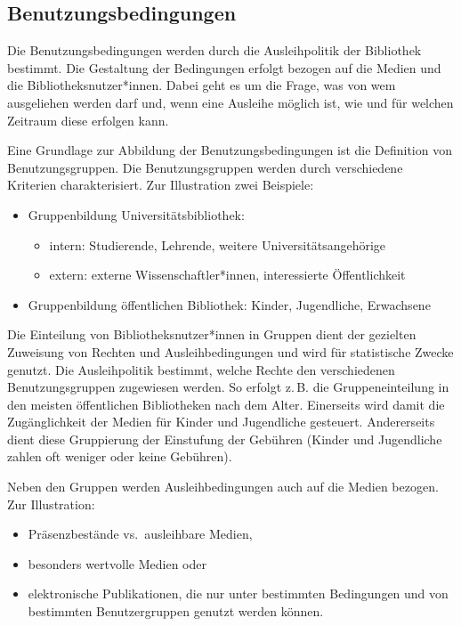 \documentclass[
  11pt,
  letterpaper,
  DIV=11,
  twoside]{scrreprt}
\begin{document}
\subsection{Benutzungsbedingungen}\label{benutzungsbedingungen}

Die Benutzungsbedingungen werden durch die Ausleihpolitik der Bibliothek
bestimmt. Die Gestaltung der Bedingungen erfolgt bezogen auf die Medien
und die Bibliotheksnutzer*innen. Dabei geht es um die Frage, was von wem
ausgeliehen werden darf und, wenn eine Ausleihe möglich ist, wie und für
welchen Zeitraum diese erfolgen kann.

Eine Grundlage zur Abbildung der Benutzungsbedingungen ist die
Definition von Benutzungsgruppen. Die Benutzungsgruppen werden durch
verschiedene Kriterien charakterisiert. Zur Illustration zwei Beispiele:

\begin{itemize}
\item
  Gruppenbildung Universitätsbibliothek:

  \begin{itemize}
  \item
    intern: Studierende, Lehrende, weitere Universitätsangehörige
  \item
    extern: externe Wissenschaftler*innen, interessierte Öffentlichkeit
  \end{itemize}
\item
  Gruppenbildung öffentlichen Bibliothek: Kinder, Jugendliche,
  Erwachsene
\end{itemize}

Die Einteilung von Bibliotheksnutzer*innen in Gruppen dient der
gezielten Zuweisung von Rechten und Ausleihbedingungen und wird für
statistische Zwecke genutzt. Die Ausleihpolitik bestimmt, welche Rechte
den verschiedenen Benutzungsgruppen zugewiesen werden. So erfolgt z.\,B.
die Gruppeneinteilung in den meisten öffentlichen Bibliotheken nach dem
Alter. Einerseits wird damit die Zugänglichkeit der Medien für Kinder
und Jugendliche gesteuert. Andererseits dient diese Gruppierung der
Einstufung der Gebühren (Kinder und Jugendliche zahlen oft weniger oder
keine Gebühren).

Neben den Gruppen werden Ausleihbedingungen auch auf die Medien bezogen.
Zur Illustration:

\begin{itemize}
\item
  Präsenzbestände vs.~ausleihbare Medien,
\item
  besonders wertvolle Medien oder
\item
  elektronische Publikationen, die nur unter bestimmten Bedingungen und
  von bestimmten Benutzergruppen genutzt werden können.
\end{itemize}
\end{document}
